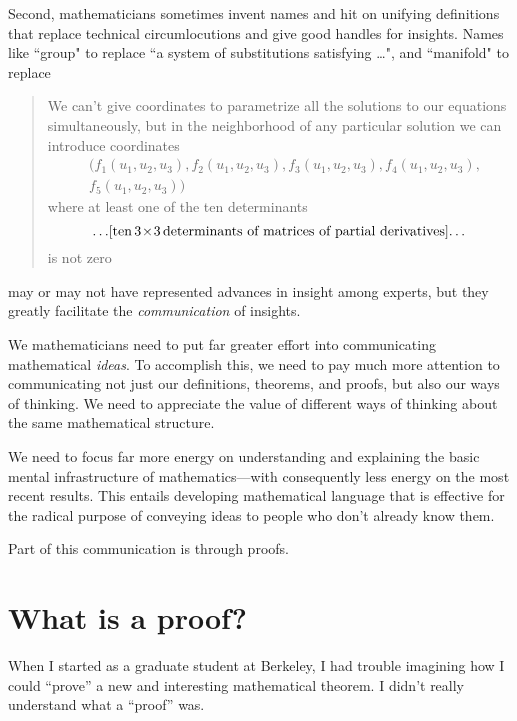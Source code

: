 Second, mathematicians sometimes invent names
and hit on unifying definitions that replace technical
circumlocutions and give good handles for insights.  
Names like ``group" to replace ``a system of substitutions 
satisfying \dots", 
and ``manifold" to replace 
\begin{quote}
We can't give coordinates to
parametrize all the solutions to our equations 
simultaneously,
but in the neighborhood of any particular solution we can 
introduce
coordinates
\begin{equation*}
\begin{aligned}
&(f_1(u_1,u_2,u_3), f_2(u_1,u_2,u_3), f_3(u_1,u_2,u_3), 
f_4(u_1,u_2,u_3),\\
&f_5(u_1,u_2,u_3))\end{aligned}\end{equation*}
where at least one of the ten determinants 
$$ \dots\! \text{[ten \!$3\!\times\!3$ \!determinants 
of matrices of partial derivatives]} \!\dots 
$$
is not zero
\end{quote}
may or may not have represented advances in insight among 
experts,
but they greatly facilitate the {\it communication} of 
insights.

\bigskip

We mathematicians need to put far greater effort into 
communicating mathematical {\it ideas}.
To accomplish this, we need to pay much more attention to 
communicating
not just our definitions, theorems, and proofs, but also
our ways of thinking.  We need to appreciate the value of 
different ways
of thinking about the same mathematical structure.

We need to focus far more
energy on understanding and explaining
the basic mental infrastructure of mathematics---with 
consequently
less energy on the most recent results.   This entails 
developing
mathematical language that is effective for the radical 
purpose of
conveying ideas to people who don't already know them.

Part of this communication is through proofs.

\section{What is a proof?}

When I started as a graduate student at Berkeley, I had 
trouble imagining
how I could ``prove'' a new and interesting mathematical 
theorem.
I didn't really understand what a ``proof'' was.

